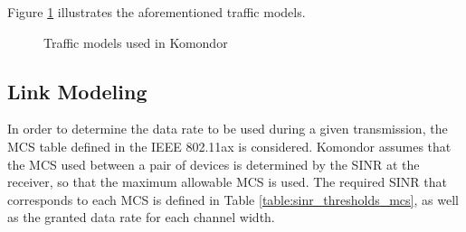 \documentclass[a4paper]{article}
\begin{document}
	Figure \ref{fig:traffic_models} illustrates the aforementioned traffic models. 
	\begin{figure}[h!]
		\centering
		\caption{Traffic models used in Komondor}
		\label{fig:traffic_models}
	\end{figure}	
	
	\subsection{Link Modeling}
	In order to determine the data rate to be used during a given transmission, the MCS table defined in the IEEE 802.11ax is considered. Komondor assumes that the MCS used between a pair of devices is determined by the SINR at the receiver, so that the maximum allowable MCS is used. The required SINR that corresponds to each MCS is defined in Table \ref{table:sinr_thresholds_mcs}, as well as the granted data rate for each channel width.
\end{document}
